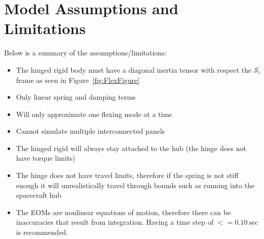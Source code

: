 \section{Model Assumptions and Limitations}
Below is a summary of the assumptions/limitations:

\begin{itemize}
	\item The hinged rigid body must have a diagonal inertia tensor with respect the $\mathcal{S}_i$ frame as seen in Figure~\ref{fig:FlexFigure}
	\item Only linear spring and damping terms
	\item Will only approximate one flexing mode at a time
	\item Cannot simulate multiple interconnected panels
	\item The hinged rigid will always stay attached to the hub (the hinge does not have torque limits)
	\item The hinge does not have travel limits, therefore if the spring is not stiff enough it will unrealistically travel through bounds such as running into the spacecraft hub
	\item The EOMs are nonlinear equations of motion, therefore there can be inaccuracies that result from integration. Having a time step of $<= 0.10\ \text{sec}$ is recommended. 
\end{itemize}